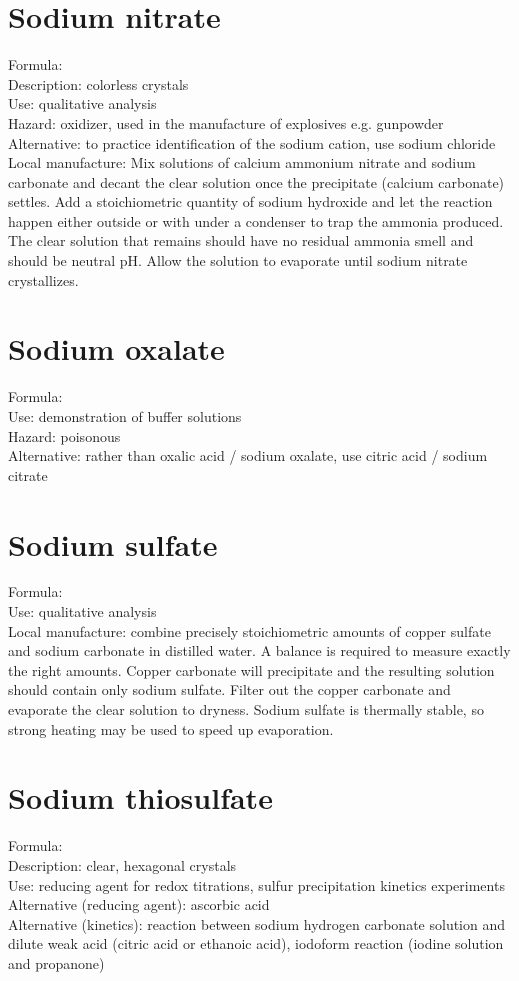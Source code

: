 \section{Sodium nitrate}
\label{sec:}
Formula: \\
Description: colorless crystals\\
Use: qualitative analysis\\
Hazard: oxidizer, 
used in the manufacture of explosives e.g. 
gunpowder\\
Alternative: to practice identification of the sodium cation, 
use sodium chloride\\
Local manufacture: Mix solutions of calcium ammonium nitrate 
and sodium carbonate and decant the clear solution 
once the precipitate (calcium carbonate) settles. 
Add a stoichiometric quantity of sodium hydroxide 
and let the reaction happen either outside 
or with under a condenser to trap the ammonia produced. 
The clear solution that remains should have no residual ammonia smell 
and should be neutral pH. 
Allow the solution to evaporate until sodium nitrate crystallizes.

\section{Sodium oxalate}
\label{sec:}
Formula: \\
Use: demonstration of buffer solutions\\
Hazard: poisonous\\
Alternative: rather than oxalic acid / sodium oxalate, 
use citric acid / sodium citrate

\section{Sodium sulfate}
\label{sec:}
Formula: \\
Use: qualitative analysis\\
Local manufacture: combine precisely stoichiometric amounts 
of copper sulfate and sodium carbonate in distilled water. 
A balance is required to measure exactly the right amounts. 
Copper carbonate will precipitate and the resulting solution 
should contain only sodium sulfate. 
Filter out the copper carbonate and evaporate the clear solution to dryness. 
Sodium sulfate is thermally stable, 
so strong heating may be used to speed up evaporation.

\section{Sodium thiosulfate}
\label{sec:}
Formula: \\
Description: clear, 
hexagonal crystals\\
Use: reducing agent for redox titrations, 
sulfur precipitation kinetics experiments\\
Alternative (reducing agent): ascorbic acid\\
Alternative (kinetics): reaction between sodium hydrogen carbonate solution 
and dilute weak acid (citric acid or ethanoic acid), 
iodoform reaction (iodine solution and propanone)\\

